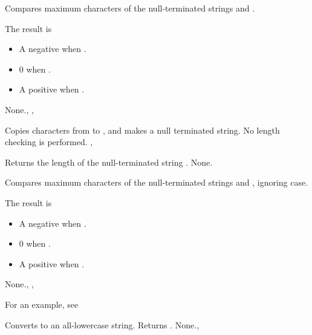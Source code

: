 \html{}

{
Compares maximum  characters of the null-terminated strings 
 and . 

The result is 
\begin{itemize}
\item A negative  when .
\item 0 when .
\item A positive  when .
\end{itemize}
}
{None.}{, , }

\html{}

{
Copies  characters from  to , and makes
 a null terminated string. 
}
{No length checking is performed.}
{, }
 
\html{}

{
Returns the length of the null-terminated string .
}
{None.}{}

\html{}

{
Compares maximum  characters of the null-terminated strings  
and , ignoring case.

The result is 
\begin{itemize}
\item A negative  when .
\item 0 when .
\item A positive  when .
\end{itemize}
}
{None.}{, , }

For an example, see 

{
Converts  to an all-lowercase string. Returns .
}
{None.}{, }

\html{}

